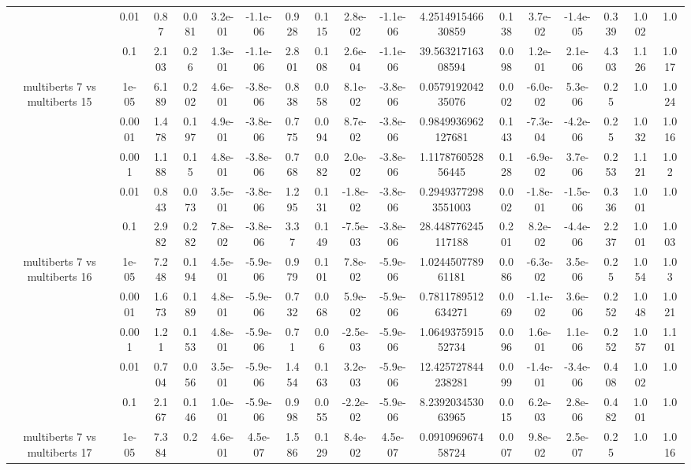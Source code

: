 \begin{tabular}{|c|c|c|c|c|c|c|c|c|c|c|c|c|c|c|c|c|}
 & 0.01 & 0.87 & 0.081 & 3.2e-01 & -1.1e-06 & 0.928 & 0.115 & 2.8e-02 & -1.1e-06 & 4.251491546630859 & 0.138 & 3.7e-02 & -1.4e-05 & 0.339 & 1.002 & 1.0 \\
 & 0.1 & 2.103 & 0.26 & 1.3e-01 & -1.1e-06 & 2.801 & 0.108 & 2.6e-04 & -1.1e-06 & 39.56321716308594 & 0.098 & 1.2e-01 & 2.1e-06 & 4.303 & 1.126 & 1.017 \\
\hline
\multirow{5}{*}{multiberts 7 vs multiberts 15} & 1e-05 & 6.189 & 0.202 & 4.6e-01 & -3.8e-06 & 0.838 & 0.058 & 8.1e-02 & -3.8e-06 & 0.057919204235076 & 0.002 & -6.0e-02 & 5.3e-06 & 0.25 & 1.0 & 1.024 \\
 & 0.0001 & 1.478 & 0.197 & 4.9e-01 & -3.8e-06 & 0.775 & 0.094 & 8.7e-02 & -3.8e-06 & 0.9849936962127681 & 0.143 & -7.3e-04 & -4.2e-06 & 0.25 & 1.032 & 1.016 \\
 & 0.001 & 1.188 & 0.15 & 4.8e-01 & -3.8e-06 & 0.768 & 0.082 & 2.0e-02 & -3.8e-06 & 1.117876052856445 & 0.128 & -6.9e-02 & 3.7e-06 & 0.253 & 1.121 & 1.02 \\
 & 0.01 & 0.843 & 0.073 & 3.5e-01 & -3.8e-06 & 1.295 & 0.131 & -1.8e-02 & -3.8e-06 & 0.29493772983551003 & 0.002 & -1.8e-01 & -1.5e-06 & 0.336 & 1.001 & 1.0 \\
 & 0.1 & 2.982 & 0.282 & 7.8e-02 & -3.8e-06 & 3.37 & 0.149 & -7.5e-03 & -3.8e-06 & 28.448776245117188 & 0.201 & 8.2e-02 & -4.4e-06 & 2.237 & 1.001 & 1.003 \\
\hline
\multirow{5}{*}{multiberts 7 vs multiberts 16} & 1e-05 & 7.248 & 0.194 & 4.5e-01 & -5.9e-06 & 0.979 & 0.101 & 7.8e-02 & -5.9e-06 & 1.024450778961181 & 0.086 & -6.3e-02 & 3.5e-06 & 0.25 & 1.054 & 1.03 \\
 & 0.0001 & 1.673 & 0.189 & 4.8e-01 & -5.9e-06 & 0.732 & 0.068 & 5.9e-02 & -5.9e-06 & 0.7811789512634271 & 0.069 & -1.1e-02 & 3.6e-06 & 0.252 & 1.048 & 1.021 \\
 & 0.001 & 1.21 & 0.153 & 4.8e-01 & -5.9e-06 & 0.71 & 0.06 & -2.5e-03 & -5.9e-06 & 1.064937591552734 & 0.096 & 1.6e-01 & 1.1e-06 & 0.252 & 1.057 & 1.101 \\
 & 0.01 & 0.704 & 0.056 & 3.5e-01 & -5.9e-06 & 1.454 & 0.163 & 3.2e-03 & -5.9e-06 & 12.425727844238281 & 0.099 & -1.4e-01 & -3.4e-06 & 0.408 & 1.002 & 1.0 \\
 & 0.1 & 2.167 & 0.146 & 1.0e-01 & -5.9e-06 & 0.998 & 0.055 & -2.2e-02 & -5.9e-06 & 8.239203453063965 & 0.015 & 6.2e-03 & 2.8e-06 & 0.482 & 1.001 & 1.0 \\
\hline
\multirow{5}{*}{multiberts 7 vs multiberts 17} & 1e-05 & 7.384 & 0.2 & 4.6e-01 & 4.5e-07 & 1.586 & 0.129 & 8.4e-02 & 4.5e-07 & 0.091096967458724 & 0.007 & 9.8e-02 & 2.5e-07 & 0.25 & 1.0 & 1.016 \\

\end{tabular}
